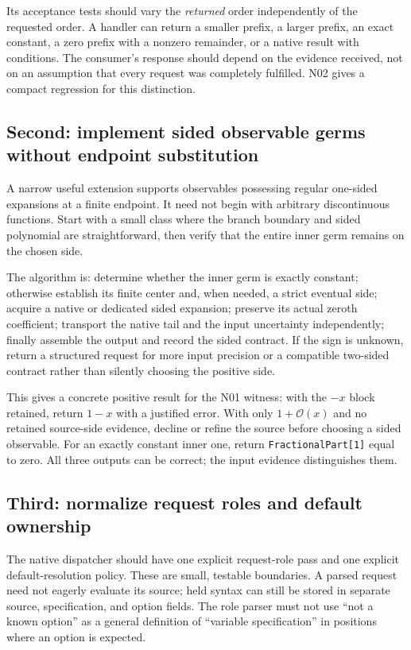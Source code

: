\documentclass[11pt,letterpaper]{article}
\newcommand{\code}[1]{\nolinkurl{#1}}
\newcommand{\OO}{\mathcal{O}}
\begin{document}
Its acceptance tests should vary the \emph{returned} order independently of the
requested order. A handler can return a smaller prefix, a larger prefix, an
exact constant, a zero prefix with a nonzero remainder, or a native result with
conditions. The consumer's response should depend on the evidence received,
not on an assumption that every request was completely fulfilled. N02 gives a
compact regression for this distinction.

\subsection{Second: implement sided observable germs without endpoint substitution}
A narrow useful extension supports observables possessing regular one-sided
expansions at a finite endpoint. It need not begin with arbitrary discontinuous
functions. Start with a small class where the branch boundary and sided
polynomial are straightforward, then verify that the entire inner germ remains
on the chosen side.

The algorithm is: determine whether the inner germ is exactly constant; otherwise
establish its finite center and, when needed, a strict eventual side; acquire a
native or dedicated sided expansion; preserve its actual zeroth coefficient;
transport the native tail and the input uncertainty independently; finally
assemble the output and record the sided contract. If the sign is unknown,
return a structured request for more input precision or a compatible two-sided
contract rather than silently choosing the positive side.

This gives a concrete positive result for the N01 witness: with the $-x$ block
retained, return $1-x$ with a justified error. With only $1+\OO(x)$ and no
retained source-side evidence, decline or refine the source before choosing a
sided observable. For an exactly constant inner one, return
\code{FractionalPart[1]} equal to zero. All three outputs can be correct; the
input evidence distinguishes them.

\subsection{Third: normalize request roles and default ownership}
The native dispatcher should have one explicit request-role pass and one
explicit default-resolution policy. These are small, testable boundaries.
A parsed request need not eagerly evaluate its source; held syntax can still be
stored in separate source, specification, and option fields. The role parser
must not use ``not a known option'' as a general definition of ``variable
specification'' in positions where an option is expected.
\end{document}
